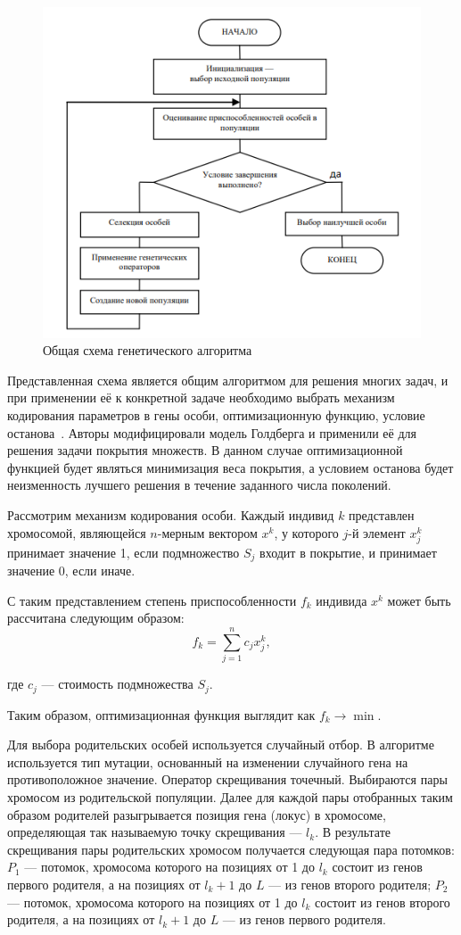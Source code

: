 \captionsetup{justification=centering,singlelinecheck=false}
\begin{figure}[H]
	\centering
	\includegraphics[width=0.7\linewidth]{inc/img/gaGeneral}
	\caption[]{Общая схема генетического алгоритма}
	\label{fig:gageneral}
\end{figure}

Представленная схема является общим алгоритмом для решения многих задач, и при применении её к конкретной задаче необходимо выбрать механизм кодирования параметров в гены особи, оптимизационную функцию, условие останова~\cite{genetic}. Авторы модифицировали модель Голдберга и применили её для решения задачи покрытия множеств. В данном случае оптимизационной функцией будет являться минимизация веса покрытия, а условием останова будет неизменность лучшего решения в течение заданного числа поколений. 

Рассмотрим механизм кодирования особи. Каждый индивид $k$ представлен хромосомой, являющейся $n$-мерным вектором $x^k$, у которого $j$-й элемент $x^k_j$ принимает значение 1, если подмножество $S_j$ входит в покрытие, и принимает значение 0, если иначе.

С таким представлением степень приспособленности $f_k$ индивида $x^k$ может быть рассчитана следующим образом:
\vspace{-5mm}
\begin{equation}
	f_k = \sum_{j=1}^{n} c_{j}x^k_j,
\end{equation}

где $c_j$ — стоимость подмножества $S_j$.

Таким образом, оптимизационная функция выглядит как $f_k \rightarrow \min$.

Для выбора родительских особей используется случайный отбор. В алгоритме используется тип мутации, основанный на изменении случайного гена на противоположное значение. Оператор скрещивания точечный. Выбираются пары хромосом из родительской популяции. Далее для каждой пары отобранных таким образом родителей разыгрывается позиция гена (локус) в хромосоме, определяющая так называемую точку скрещивания --- $l_k$. В результате скрещивания пары родительских хромосом получается следующая пара потомков: $P_1$ — потомок, хромосома которого на позициях от 1 до $l_k$ состоит из генов первого родителя, а на позициях от $l_k + 1$ до $L$ --- из генов второго родителя; $P_2$ — потомок, хромосома которого на позициях от 1 до $l_k$ состоит из генов второго родителя, а на позициях от $l_k + 1$ до $L$ --- из генов первого родителя. 

